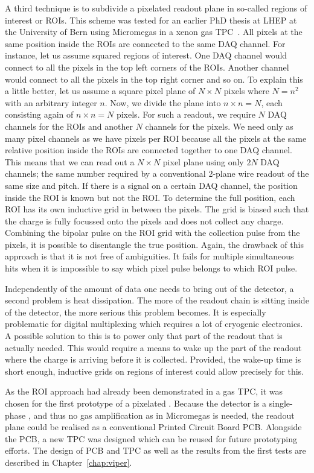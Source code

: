 A third technique is to subdivide a pixelated readout plane in so-called regions of interest or ROIs.
This scheme was tested for an earlier PhD thesis at LHEP at the University of Bern using Micromegas in a xenon gas TPC~\cite{maplesyrup}.
All pixels at the same position inside the ROIs are connected to the same DAQ channel.
For instance, let us assume squared regions of interest.
One DAQ channel would connect to all the pixels in the top left corners of the ROIs.
Another channel would connect to all the pixels in the top right corner and so on.
To explain this a little better, let us assume a square pixel plane of $N \times N$ pixels where $N = n ^ 2$ with an arbitrary integer $n$.
Now, we divide the plane into $n \times n = N$, each consisting again of $n \times n = N$ pixels.
For such a readout, we require $N$ DAQ channels for the ROIs and another $N$ channels for the pixels.
We need only as many pixel channels as we have pixels per ROI because all the pixels at the same relative position inside the ROIs are connected together to one DAQ channel.
This means that we can read out a $N \times N$ pixel plane using only $2 N$ DAQ channels; the same number required by a conventional 2-plane wire readout of the same size and pitch.
If there is a signal on a certain DAQ channel, the position inside the ROI is known but not the ROI.
To determine the full position, each ROI has its own inductive grid in between the pixels.
The grid is biased such that the charge is fully focussed onto the pixels and does not collect any charge.
Combining the bipolar pulse on the ROI grid with the collection pulse from the pixels, it is possible to disentangle the true position.
Again, the drawback of this approach is that it is not free of ambiguities.
It fails for multiple simultaneous hits when it is impossible to say which pixel pulse belongs to which ROI pulse.

Independently of the amount of data one needs to bring out of the detector, a second problem is heat dissipation.
The more of the readout chain is sitting inside of the detector, the more serious this problem becomes.
It is especially problematic for digital multiplexing which requires a lot of cryogenic electronics.
A possible solution to this is to power only that part of the readout that is actually needed.
This would require a means to wake up the part of the readout where the charge is arriving before it is collected.
Provided, the wake-up time is short enough, inductive grids on regions of interest could allow precisely for this.

As the ROI approach had already been demonstrated in a gas TPC, it was chosen for the first prototype of a pixelated \lartpc{}.
Because the detector is a single-phase \lartpc{}, and thus no gas amplification as in Micromegas is needed, the readout plane could be realised as a conventional Printed Circuit Board PCB.
Alongside the PCB, a new TPC was designed which can be reused for future prototyping efforts.
The design of PCB and TPC as well as the results from the first tests are described in Chapter~\ref{chap:viper}.